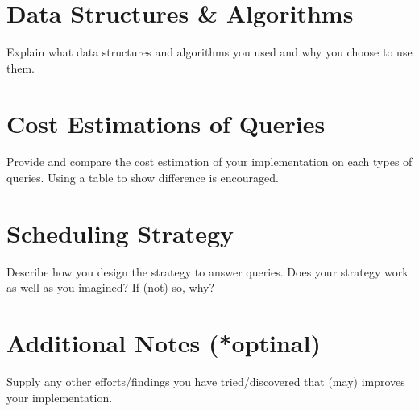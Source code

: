 \documentclass{article}
\begin{document}
\section*{Data Structures \& Algorithms}
Explain what data structures and algorithms you used and why you choose to use them.

\section*{Cost Estimations of Queries}
Provide and compare the cost estimation of your implementation on each types of queries. Using a table to show difference is encouraged.

\section*{Scheduling Strategy}
Describe how you design the strategy to answer queries. Does your strategy work as well as you imagined? If (not) so, why?

\section*{Additional Notes (*optinal)}
Supply any other efforts/findings you have tried/discovered that (may) improves your implementation.
\end{document}

